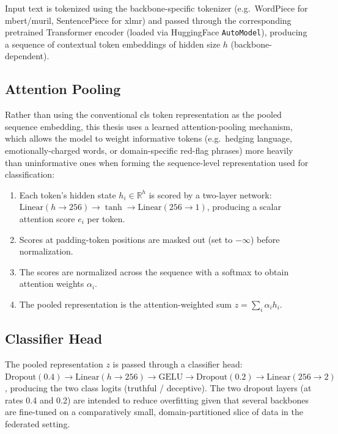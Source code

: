 Input text is tokenized using the backbone-specific tokenizer (e.g.\ WordPiece for \gls{mbert}/\gls{muril}, SentencePiece for \gls{xlmr}) and passed through the corresponding pretrained Transformer encoder \cite{vaswani2017attention} (loaded via HuggingFace \texttt{AutoModel}), producing a sequence of contextual token embeddings of hidden size $h$ (backbone-dependent).

\subsection{Attention Pooling}

Rather than using the conventional \gls{cls} token representation as the pooled sequence embedding, this thesis uses a learned attention-pooling mechanism, which allows the model to weight informative tokens (e.g.\ hedging language, emotionally-charged words, or domain-specific red-flag phrases) more heavily than uninformative ones when forming the sequence-level representation used for classification:

\begin{enumerate}
    \item Each token's hidden state $h_i \in \mathbb{R}^{h}$ is scored by a two-layer network: $\text{Linear}(h \rightarrow 256) \rightarrow \tanh \rightarrow \text{Linear}(256 \rightarrow 1)$, producing a scalar attention score $e_i$ per token.
    \item Scores at padding-token positions are masked out (set to $-\infty$) before normalization.
    \item The scores are normalized across the sequence with a softmax to obtain attention weights $\alpha_i$.
    \item The pooled representation is the attention-weighted sum $z = \sum_i \alpha_i h_i$.
\end{enumerate}

\subsection{Classifier Head}

The pooled representation $z$ is passed through a classifier head: $\text{Dropout}(0.4) \rightarrow \text{Linear}(h \rightarrow 256) \rightarrow \text{GELU} \rightarrow \text{Dropout}(0.2) \rightarrow \text{Linear}(256 \rightarrow 2)$, producing the two class logits (truthful / deceptive). The two dropout layers (at rates 0.4 and 0.2) are intended to reduce overfitting given that several backbones are fine-tuned on a comparatively small, domain-partitioned slice of data in the federated setting.

